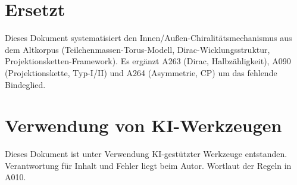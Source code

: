 \section{Ersetzt}

Dieses Dokument systematisiert den Innen/Außen-Chiralitätsmechanismus
aus dem Altkorpus (Teilchenmassen-Torus-Modell, Dirac-Wicklungsstruktur,
Projektionsketten-Framework). Es ergänzt A263 (Dirac, Halbzähligkeit),
A090 (Projektionskette, Typ-I/II) und A264 (Asymmetrie, CP) um das
fehlende Bindeglied.

\section{Verwendung von KI-Werkzeugen}

Dieses Dokument ist unter Verwendung KI-gestützter Werkzeuge entstanden.
Verantwortung für Inhalt und Fehler liegt beim Autor. Wortlaut der Regeln in A010.
